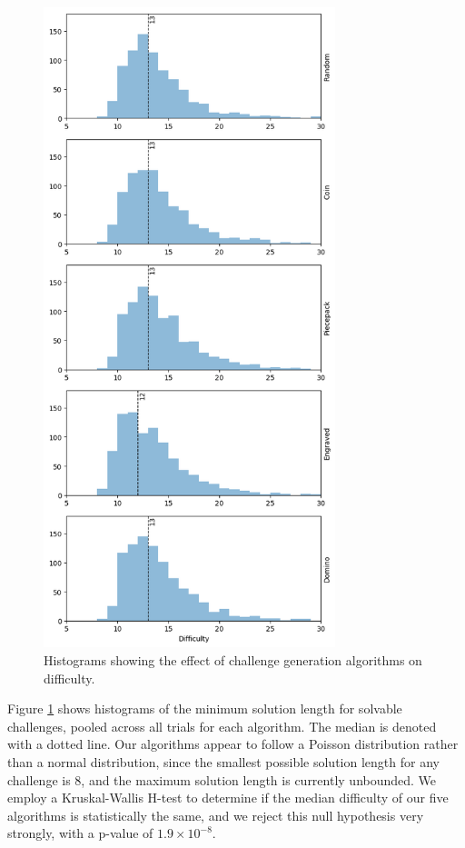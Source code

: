 \documentclass[10pt,journal,compsoc]{IEEEtran}
\begin{document}
\begin{figure}[t]
\centering
\includegraphics[width=8.5cm]{standalonediff.png}
\caption{Histograms showing the effect of challenge generation algorithms on difficulty.}
\label{fig:difficultycomp}
\end{figure}

Figure \ref{fig:difficultycomp} shows histograms of the minimum solution length for solvable challenges, pooled across all trials for each algorithm. The median is denoted with a dotted line. Our algorithms appear to follow a Poisson distribution rather than a normal distribution, since the smallest possible solution length for any challenge is 8, and the maximum solution length is currently unbounded. We employ a Kruskal-Wallis H-test \cite{KRUSKAL} to determine if the median difficulty of our five algorithms is statistically the same, and we reject this null hypothesis very strongly, with a p-value of $1.9 \times 10^{-8}$.
\end{document}
